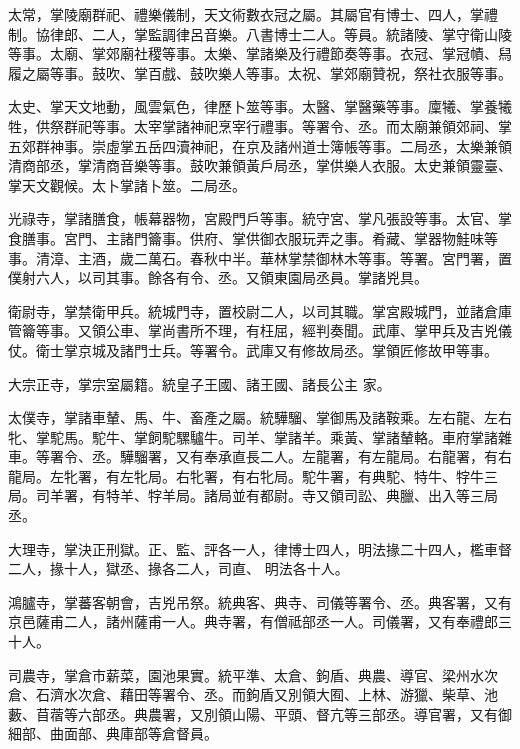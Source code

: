 \begin{pinyinscope}
 太常，掌陵廟群祀、禮樂儀制，天文術數衣冠之屬。其屬官有博士、四人，掌禮制。協律郎、二人，掌監調律呂音樂。八書博士二人。等員。統諸陵、掌守衛山陵等事。太廟、掌郊廟社稷等事。太樂、掌諸樂及行禮節奏等事。衣冠、掌冠幘、舄履之屬等事。鼓吹、掌百戲、鼓吹樂人等事。太祝、掌郊廟贊祝，祭社衣服等事。



 太史、掌天文地動，風雲氣色，律歷卜筮等事。太醫、掌醫藥等事。廩犧、掌養犧牲，供祭群祀等事。太宰掌諸神祀烹宰行禮事。等署令、丞。而太廟兼領郊祠、掌五郊群神事。崇虛掌五岳四瀆神祀，在京及諸州道士簿帳等事。二局丞，太樂兼領清商部丞，掌清商音樂等事。鼓吹兼領黃戶局丞，掌供樂人衣服。太史兼領靈臺、掌天文觀候。太卜掌諸卜筮。二局丞。



 光祿寺，掌諸膳食，帳幕器物，宮殿門戶等事。統守宮、掌凡張設等事。太官、掌食膳事。宮門、主諸門籥事。供府、掌供御衣服玩弄之事。肴藏、掌器物鮭味等事。清漳、主酒，歲二萬石。春秋中半。華林掌禁御林木等事。等署。宮門署，置僕射六人，以司其事。餘各有令、丞。又領東園局丞員。掌諸兇具。



 衛尉寺，掌禁衛甲兵。統城門寺，置校尉二人，以司其職。掌宮殿城門，並諸倉庫管籥等事。又領公車、掌尚書所不理，有枉屈，經判奏聞。武庫、掌甲兵及吉兇儀仗。衛士掌京城及諸門士兵。等署令。武庫又有修故局丞。掌領匠修故甲等事。



 大宗正寺，掌宗室屬籍。統皇子王國、諸王國、諸長公主
 家。



 太僕寺，掌諸車輦、馬、牛、畜產之屬。統驊騮、掌御馬及諸鞍乘。左右龍、左右牝、掌駝馬。駝牛、掌飼駝騾驢牛。司羊、掌諸羊。乘黃、掌諸輦輅。車府掌諸雜車。等署令、丞。驊騮署，又有奉承直長二人。左龍署，有左龍局。右龍署，有右龍局。左牝署，有左牝局。右牝署，有右牝局。駝牛署，有典駝、特牛、牸牛三局。司羊署，有特羊、牸羊局。諸局並有都尉。寺又領司訟、典臘、出入等三局丞。



 大理寺，掌決正刑獄。正、監、評各一人，律博士四人，明法掾二十四人，檻車督二人，掾十人，獄丞、掾各二人，司直、
 明法各十人。



 鴻臚寺，掌蕃客朝會，吉兇吊祭。統典客、典寺、司儀等署令、丞。典客署，又有京邑薩甫二人，諸州薩甫一人。典寺署，有僧祗部丞一人。司儀署，又有奉禮郎三十人。



 司農寺，掌倉市薪菜，園池果實。統平準、太倉、鉤盾、典農、導官、梁州水次倉、石濟水次倉、藉田等署令、丞。而鉤盾又別領大囿、上林、游獵、柴草、池藪、苜蓿等六部丞。典農署，又別領山陽、平頭、督亢等三部丞。導官署，又有御細部、曲面部、典庫部等倉督員。




\end{pinyinscope}
